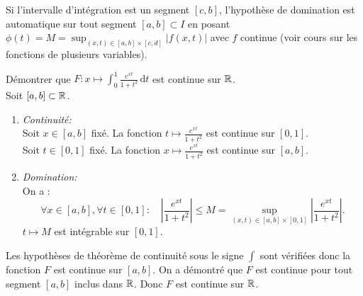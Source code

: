 \documentclass{book}
\begin{document}
Si l'intervalle d'intégration est un segment $[c,b]$, l'hypothèse de domination est
automatique sur tout segment $[a ,b ] \subset I$ en posant $\phi(t)=M=\sup_{(x,t)\in[a,b]\times[c,d]}|f(x,t)|$ avec $f$ continue (voir cours sur les fonctions de plusieurs variables).
\begin{Exemple}
Démontrer que $F:x\mapsto \int_{0}^{1}\frac{ e^{xt}}{1+t^2}\,\mathrm dt$ est continue sur $\mathbb{R}$.\\
Soit $[a,b]\subset \mathbb{R}$.
\begin{enumerate}
\item \textit{Continuité:}\\ 
Soit $x\in [a,b]$ fixé. La fonction $t\mapsto \frac{ e^{xt}}{1+t^2}$ est continue  sur $[0,1]$.\\
Soit $t\in [0,1]$ fixé. La fonction $x\mapsto \frac{ e^{xt}}{1+t^2}$ est continue  sur  $[a,b]$.
\item  \textit{Domination:}\\
On a :
$$\forall x\in [a,b], \forall t\in [0,1]: \quad  \left|\frac{ e^{xt}}{1+t^2}\right|\leq M=\sup_{(x,t)\in[a,b]\times[0,1]}|\frac{ e^{xt}}{1+t^2}| .$$
$t\mapsto M$ est intégrable sur $[0,1]$.\\
\end{enumerate}
Les hypothèses de théorème de continuité sous le signe $\int$ sont vérifiées donc la fonction $F$ est continue sur $[a,b]$.
On a démontré que $F$  est continue pour tout segment $[a,b]$ inclus dans $\mathbb{R}$. Donc $F$ est continue sur $\mathbb{R}$. 
\end{Exemple}


\end{document}
